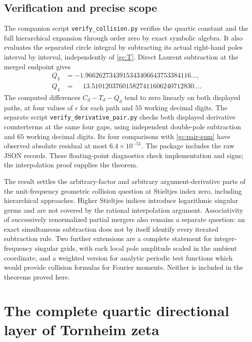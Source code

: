 \documentclass[11pt]{article}
\numberwithin{equation}{section}
\theoremstyle{definition}
\theoremstyle{remark}
\begin{document}
\subsection{Verification and precise scope}
The companion script \texttt{verify\_collision.py} verifies the quartic
constant and the full hierarchical expansion through order zero by exact
symbolic algebra.  It also evaluates the separated circle integral by
subtracting its actual right-hand poles interval by interval, independently
of \eqref{gc:T}.  Direct Laurent subtraction at
the merged endpoint gives
\begin{align*}
 Q_3&=-1.9662627343915343406643753384116\ldots,\\
 Q_4&=\phantom{-}13.510120376015827411606240712830\ldots.
\end{align*}
The computed differences $C_d-T_d-Q_d$ tend to zero linearly on both
displayed paths, at four values of $\epsilon$ for each path and $55$
working decimal digits.  The separate script
\texttt{verify\_derivative\_pair.py} checks both displayed derivative
counterterms at the same four gaps, using independent double-pole
subtraction and $65$ working decimal digits.  Its four comparisons with
\eqref{gc:pair-sum} have observed absolute residual at most
$6.4\times10^{-51}$.  The package includes the raw JSON records.
These floating-point diagnostics check implementation and signs; the
interpolation proof supplies the theorem.

The result settles the arbitrary-factor and arbitrary argument-derivative
parts of the unit-frequency geometric collision question at Stieltjes index zero,
including hierarchical approaches.  Higher Stieltjes indices introduce
logarithmic singular germs and are not covered by the rational
interpolation argument.  Associativity of successively renormalized
partial mergers also remains a separate question: an exact simultaneous
subtraction does not by itself identify every iterated subtraction rule.
Two further extensions are a complete statement for integer-frequency
singular grids, with each local pole amplitude scaled in the ambient
coordinate, and a weighted version for analytic periodic test functions
which would provide collision formulas for Fourier moments.  Neither is
included in the theorems proved here.


\section{The complete quartic directional layer of Tornheim zeta}
\label{qt:sec}
\end{document}
